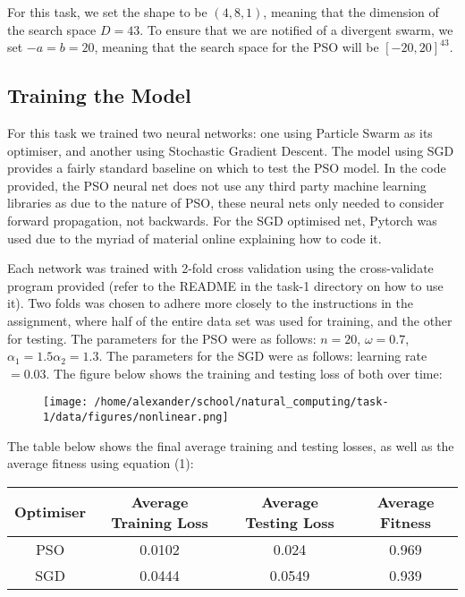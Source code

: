 \documentclass[12pt]{article}
\begin{document}
For this task, we set the shape to be $\left(4, 8, 1\right)$, meaning that the dimension of the search space $D=43$. 
To ensure that we are notified of a divergent swarm, we set $-a=b=20$, meaning that the search space for the PSO will be $\left[-20,20\right]^{43}$. 

\subsection{Training the Model}
For this task we trained two neural networks: one using Particle Swarm as its optimiser, and another using Stochastic Gradient Descent.
The model using SGD provides a fairly standard baseline on which to test the PSO model. 
In the code provided, the PSO neural net does not use any third party machine learning libraries as due to the nature of PSO, these neural nets only needed to consider forward propagation, not backwards.
For the SGD optimised net, Pytorch was used due to the myriad of material online explaining how to code it. 

Each network was trained with 2-fold cross validation using the cross-validate program provided (refer to the README in the task-1 directory on how to use it). 
Two folds was chosen to adhere more closely to the instructions in the assignment, where half of the entire data set was used for training, and the other for testing.
The parameters for the PSO were as follows: $n=20$, $\omega=0.7$, $\alpha_1 = 1.5 \alpha_2 = 1.3$. 
The parameters for the SGD were as follows: learning rate $=0.03$.
The figure below shows the training and testing loss of both over time:

\begin{figure}[h]                   
      \begin{center}                  
          \texttt{[image: /home/alexander/school/natural\_computing/task-1/data/figures/nonlinear.png]}    
      \end{center}                                                                                              
\end{figure}
The table below shows the final average training and testing losses, as well as the average fitness using equation (1):
\begin{center}
 \begin{tabular}{||c c c c||} 
 \hline
 Optimiser & Average Training Loss & Average Testing Loss & Average Fitness \\ [0.5ex] 
 \hline\hline
 PSO & 0.0102 & 0.024 & 0.969 \\ 
 \hline
 SGD & 0.0444 & 0.0549 & 0.939 \\
 \hline
\end{tabular}
\end{center}
\end{document}
